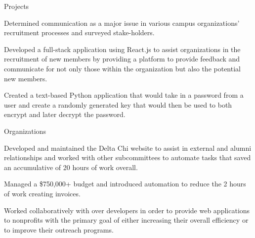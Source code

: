 \documentclass{resume} %
\begin{document}


\begin{workSection}{Projects}
     \customItem[
        title=RushKit,
        duration=July 2022 – Present,
        keyHighlight=Recruitment Web Application,
        location=Atlanta{,} GA
     ]
     \begin{bullets}
        \item Determined communication as a major issue in various campus organizations' recruitment processes and surveyed stake-holders.
        \item Developed a full-stack application using React.js to assist organizations in the recruitment of new members by providing a platform to provide feedback and communicate for not only those within the organization but also the potential new members.
     \end{bullets}

     \customItem[
        title=Encryption Project,
        duration=February 2020 - April 2020,
        keyHighlight=Python Script,
        location=Atlanta{,} GA
     ]
     \begin{bullets}
        \item Created a text-based Python application that would take in a password from a user and create a randomly generated key that would then be used to both encrypt and later decrypt the password.

     \end{bullets}
\end{workSection}


\begin{workSection}{Organizations}
     \customItem[
        title=Bits of Good,
        keyHighlight=Developer,
        duration=January 2023 – Present,
        location=Atlanta{,} GA
    ]
     \begin{bullets}
        \item Developed and maintained the Delta Chi website to assist in external and alumni relationships and worked with other subcommittees to automate tasks that saved an accumulative of 20 hours of work overall.
        \item Managed a \$750,000+ budget and introduced automation to reduce the 2 hours of work creating invoices. 

     \end{bullets}
     
     \customItem[
        title=Delta Chi Fraternity,
        keyHighlight=Treasurer{,} Technology Chair,
        duration=August 2021 – Present,
        location=Atlanta{,} GA
    ]
     \begin{bullets}
        \item Worked collaboratively with over developers in order to provide web applications to nonprofits with the primary goal of either increasing their overall efficiency or to improve their outreach programs.
     \end{bullets}
\end{workSection}
\end{document}
